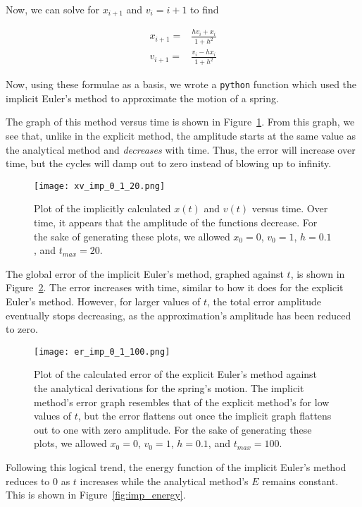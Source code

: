 \documentclass{article}
\begin{document}
Now, we can solve for $x_{i + 1}$ and $v_i={i + 1}$ to find

\begin{eqnarray}
    x_{i + 1} =& \frac{h v_i + x_i}{1 + h^2} \\
    v_{i + 1} =& \frac{v_i - hx_i}{1 + h^2}
\end{eqnarray}

Now, using these formulae as a basis, we wrote a \texttt{python} function which used the implicit Euler's method to approximate the motion of a spring.  

The graph of this method versus time is shown in Figure~\ref{fig:imp_num_spring}.  From this graph, we see that, unlike in the explicit method, the amplitude starts at the same value as the analytical method and \textit{decreases} with time. Thus, the error will increase over time, but the cycles will damp out to zero instead of blowing up to infinity.  

\begin{figure}
    \centering
    \texttt{[image: xv\_imp\_0\_1\_20.png]}{}
    \caption{Plot of the implicitly calculated $x(t)$ and $v(t)$ versus time.  Over time, it appears that the amplitude of the functions decrease. For the sake of generating these plots, we allowed $x_0 = 0$, $v_0 = 1$, $h = 0.1$, and $t_{max} = 20$.}
    \label{fig:imp_num_spring}
\end{figure}

The global error of the implicit Euler's method, graphed against $t$, is shown in Figure~\ref{fig:err_imp}.  The error increases with time, similar to how it does for the explicit Euler's method.  However, for larger values of $t$, the total error amplitude eventually stops decreasing, as the approximation's amplitude has been reduced to zero.

\begin{figure}
    \centering
    \texttt{[image: er\_imp\_0\_1\_100.png]}{}
    \caption{Plot of the calculated error of the explicit Euler's method against the analytical derivations for the spring's motion.  The implicit method's error graph resembles that of the explicit method's for low values of $t$, but the error flattens out once the implicit graph flattens out to one with zero amplitude.  For the sake of generating these plots, we allowed $x_0 = 0$, $v_0 = 1$, $h = 0.1$, and $t_{max} = 100$.}
    \label{fig:err_imp}
\end{figure}

Following this logical trend, the energy function of the implicit Euler's method reduces to $0$ as $t$ increases while the analytical method's $E$ remains constant.  This is shown in Figure~\ref{fig:imp_energy}.  
\end{document}
